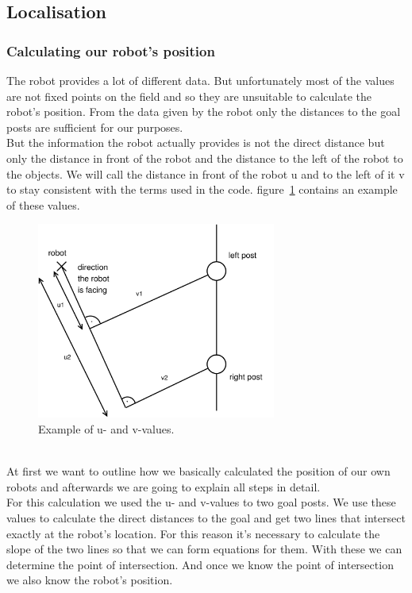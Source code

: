 \documentclass[lnicst,a4paper]{svmultln}
\begin{document}

\subsection{Localisation}

\subsubsection{Calculating our robot's position}
The robot provides a lot of different data.
But unfortunately most of the values are not fixed points on the field and so they are unsuitable to calculate the robot's position. From the data given by the robot only the distances to the goal posts are sufficient for our purposes.
\\
But the information the robot actually provides is not the direct distance but only the distance in front of the robot and the distance to the left of the robot to the objects. We will call the distance in front of the robot u and to the left of it v to stay consistent with the terms used in the code. figure~\ref{fig:uvvalues} contains an example of these values.
\begin{figure}
 	\centerline{\includegraphics[width=0.7\textwidth]{uvvalues.pdf}}
	{\caption{Example of u- and v-values.}\label{fig:uvvalues}}
\end{figure}
\\
At first we want to outline how we basically calculated the position of our own robots and afterwards we are going to explain all steps in detail.
\\
For this calculation we used the u- and v-values to two goal posts. We use these values to calculate the direct distances to the goal and get two lines that intersect exactly at the robot's location. For this reason it's necessary to calculate the slope of the two lines so that we can form equations for them. With these we can determine the point of intersection. And once we know the point of intersection we also know the robot's position.
\end{document}

